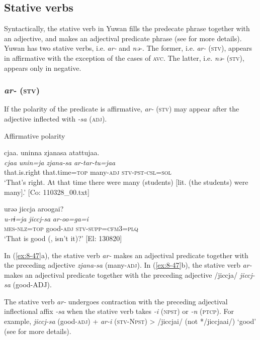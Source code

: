 \subsection{Stative verbs}

Syntactically, the stative verb in Yuwan fills the predecate phrase together with an adjective, and makes an adjectival predicate phrase (see  for more details). Yuwan has two stative verbs, i.e. \textit{ar-} and \textit{nə-}. The former, i.e. \textit{ar-} (\textsc{stv}), appears in affirmative with the exception of the cases of \textsc{avc}. The latter, i.e. \textit{nə-} (\textsc{stv}), appears only in negative.

\subsubsection{\textit{ar-} (\textsc{stv})}

If the polarity of the predicate is affirmative, \textit{ar-} (\textsc{stv}) may appear after the adjective inflected with \textit{-sa} (\textsc{adj}).

\ea\label{ex:8-47}
  Affirmative polarity

\ea {\US}
\glll   cjaa.  uninna  zjanasa  atattujaa.\\
\textit{cjaa}  \textit{unin=ja}  \textit{zjana-sa}  \textit{ar-tar-tu=jaa}\\
that.is.right  that.time=\textsc{top}  many-\textsc{adj}  \textsc{stv}-\textsc{pst}-\textsc{csl}=\textsc{sol}\\
\glt ‘That’s right. At that time there were many (students) [lit. (the students) were many].’ [Co: 110328\_00.txt]

\ex
{\TM}
\glll  urəə  jiccja  aroogai?\\
\textit{u-rɨ=ja}  \textit{jiccj-sa}  \textit{ar-oo=ga=i}\\
\textsc{mes}-\textsc{nlz}=\textsc{top}  good-\textsc{adj}  \textsc{stv}-\textsc{supp}=\textsc{cfm3}=\textsc{plq}\\
\glt ‘That is good (, isn’t it)?’ [El: 130820]
\z
\z

In (\ref{ex:8-47}a), the stative verb \textit{ar-} makes an adjectival predicate together with the preceding adjective \textit{zjana-sa} (many-\textsc{adj}). In (\ref{ex:8-47}b), the stative verb \textit{ar-} makes an adjectival predicate together with the preceding adjective /jiccja/ \textit{jiccj-sa} (good-ADJ).

  The stative verb \textit{ar-} undergoes contraction with the preceding adjectival inflectional affix \textit{-sa} when the stative verb takes \textit{-i} (\textsc{npst}) or \textit{-n} (\textsc{ptcp}). For example, \textit{jiccj-sa} (good-\textsc{adj}) + \textit{ar-i} (\textsc{stv}-N\textsc{pst}) > /jiccjai/ (not */jiccjaai/) ‘good’ (see  for more details).

